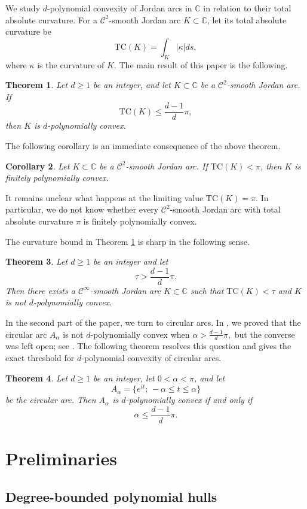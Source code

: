 \documentclass[10pt,a4paper]{amsart}
\newtheorem{theorem}{Theorem}[section]
\newtheorem{corollary}[theorem]{Corollary}
\newcommand{\C}{\mathbb{C}}
\newcommand{\T}{\mathrm{TC}}
\newcommand{\cC}{\mathcal{C}}
\numberwithin{equation}{section}
\begin{document}
We study $d$-polynomial convexity of Jordan arcs in $\mathbb C$
in relation to their total absolute curvature. For a $\cC^2$-smooth Jordan arc $K\subset\C$, let its total absolute curvature be \[\T(K)=\int_K|\kappa|ds,\]
where $\kappa$ is the curvature of $K$. The main result of this paper is the following.
\begin{theorem} \label{T1} Let $d\geq 1$ be an integer, and let $K\subset\C$ be a $\cC^2$-smooth Jordan arc. If \[\T(K)\le\frac{d-1}{d}\pi,\]  
then $K$ is $d$-polynomially convex.   
\end{theorem}
The following corollary is an immediate consequence of the above theorem. 
\begin{corollary} Let $K\subset\C$ be a $\cC^2$-smooth Jordan arc. If $\T(K)<\pi$, then $K$ is finitely polynomially convex.  	
\end{corollary}
It remains unclear what happens at the limiting value $\T(K)=\pi$.
In particular, we do not know whether every $\cC^2$-smooth Jordan arc
with total absolute curvature $\pi$ is finitely polynomially convex.

The curvature bound in Theorem \ref{T1} is sharp in the following sense.
\begin{theorem} \label{T2} 
Let $d\ge 1$ be an integer and let
\[\tau>\frac{d-1}{d}\pi.\]
Then there exists a $\cC^{\infty}$-smooth Jordan arc $K\subset\C$ such that $\T(K)<\tau$ and $K$ is not $d$-polynomially convex.
\end{theorem}

In the second part of the paper, we turn to circular arcs. In \cite[Proposition~16]{S}, we proved that the circular arc $A_\alpha$ is not $d$-polynomially convex when $\alpha>\frac{d-1}{d}\pi,$
but the converse was left open; see \cite[Remark~17]{S}. The following theorem resolves this question and gives the exact threshold for $d$-polynomial convexity of circular arcs.

\begin{theorem} \label{T3} 
Let $d\ge 1$ be an integer, let $0<\alpha<\pi$, and let
\[A_\alpha=\{e^{it};\,-\alpha\le t\le\alpha\}
\] 
be the circular arc. Then $A_\alpha$ is $d$-polynomially convex if and only if
\[\alpha\le\frac{d-1}{d}\pi.\]
\end{theorem}


\section{Preliminaries}
\subsection{Degree-bounded polynomial hulls}
\end{document}
